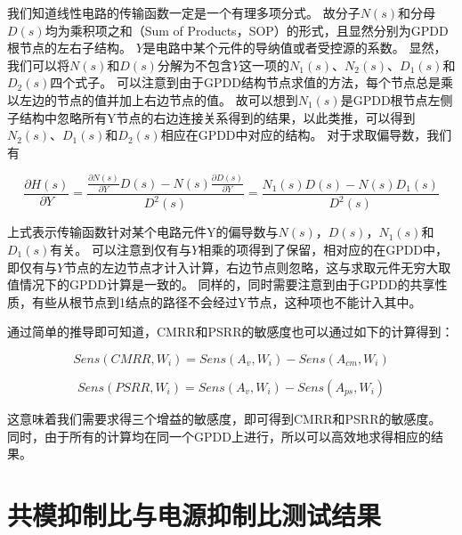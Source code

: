 我们知道线性电路的传输函数一定是一个有理多项分式。
故分子$N\left(s\right)$和分母$D\left(s\right)$均为乘积项之和（Sum of Products，SOP）的形式，且显然分别为GPDD根节点的左右子结构。
$Y$是电路中某个元件的导纳值或者受控源的系数。
显然，我们可以将$N\left(s\right)$和$D\left(s\right)$分解为不包含$Y$这一项的$N_1\left(s\right)$、$N_2\left(s\right)$、$D_1\left(s\right)$和$D_2\left(s\right)$四个式子。
可以注意到由于GPDD结构节点求值的方法，每个节点总是乘以左边的节点的值并加上右边节点的值。
故可以想到$N_1\left(s\right)$是GPDD根节点左侧子结构中忽略所有Y节点的右边连接关系得到的结果，以此类推，可以得到$N_2\left(s\right)$、$D_1\left(s\right)$和$D_2\left(s\right)$相应在GPDD中对应的结构。
对于求取偏导数，我们有

\begin{equation}
\frac{{\partial H\left( s \right)}}
{{\partial Y}} = \frac{{\frac{{\partial N\left( s \right)}}
		{{\partial Y}}D\left( s \right) - N\left( s \right)\frac{{\partial D\left( s \right)}}
		{{\partial Y}}}}
{{{D^2}\left( s \right)}} = \frac{{{N_1}\left( s \right)D\left( s \right) - N\left( s \right){D_1}\left( s \right)}}
{{{D^2}\left( s \right)}}
\end{equation}

上式表示传输函数针对某个电路元件Y的偏导数与$N\left(s\right)$，$D\left(s\right)$，$N_1\left(s\right)$和$D_1\left(s\right)$有关。
可以注意到仅有与$Y$相乘的项得到了保留，相对应的在GPDD中，即仅有与$Y$节点的左边节点才计入计算，右边节点则忽略，这与求取元件无穷大取值情况下的GPDD计算是一致的。
同样的，同时需要注意到由于GPDD的共享性质，有些从根节点到1结点的路径不会经过Y节点，这种项也不能计入其中。

通过简单的推导即可知道，CMRR和PSRR的敏感度也可以通过如下的计算得到：

\begin{equation}
Sens\left( {{CMRR},{W_i}} \right) = Sens\left( {{A_{v}},{W_i}} \right) - Sens\left( {{A_{cm}},{W_i}} \right)
\end{equation}

\begin{equation}
Sens\left( {{PSRR},{W_i}} \right) = Sens\left( {{A_{v}},{W_i}} \right) - Sens\left( {{A_{ps}},{W_i}} \right)
\end{equation}

这意味着我们需要求得三个增益的敏感度，即可得到CMRR和PSRR的敏感度。
同时，由于所有的计算均在同一个GPDD上进行，所以可以高效地求得相应的结果。

\section{共模抑制比与电源抑制比测试结果}
\label{sec:cmps:test}

